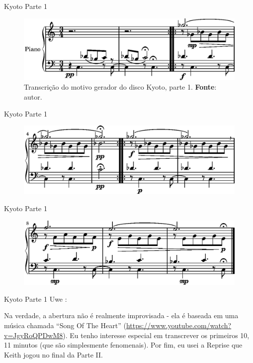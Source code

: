 \documentclass[aspectratio=169]{beamer}
\begin{document}
\begin{frame}{Kyoto Parte 1}
\begin{figure}[!h]
  \centering
  \includegraphics{7e/lily-467b1ac8-1}%
  \caption{Transcrição do motivo gerador do disco Kyoto, parte 1. \textbf{Fonte}: autor.}
  \label{fig:Jarret_intro}
\end{figure}
\end{frame}

\begin{frame}{Kyoto Parte 1}
\begin{figure}[!h]
\centering
\includegraphics{7e/lily-467b1ac8-2}%
\end{figure}
\end{frame}

\begin{frame}{Kyoto Parte 1}
\begin{figure}[!h]
\centering
\includegraphics{7e/lily-467b1ac8-3}%
\end{figure}
\end{frame}

\begin{frame}{Kyoto Parte 1}
Uwe :

Na verdade, a abertura não é realmente improvisada - ela é baseada em uma música chamada ``Song Of The Heart'' (\url{https://www.youtube.com/watch?v=JgyRoQPDwM8}). Eu tenho interesse especial em transcrever os primeiros 10, 11 minutos (que são simplesmente fenomenais). Por fim, eu usei a Reprise que Keith jogou no final da Parte II.
\end{frame}
\end{document}

